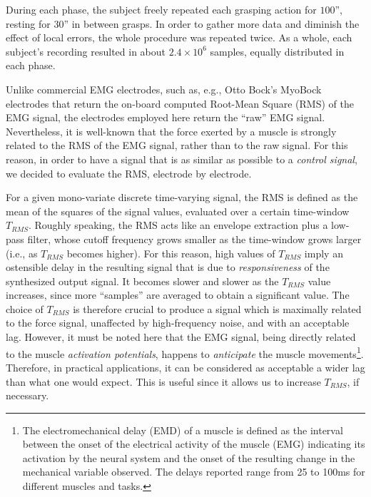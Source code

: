 During each phase, the subject freely repeated each grasping action
for $100$'', resting for $30$'' in between grasps. In order to gather
more data and diminish the effect of local errors, the whole procedure
was repeated twice. As a whole, each subject's recording resulted in
about $2.4\times 10^6$ samples, equally distributed in each phase.

Unlike commercial EMG electrodes, such as, e.g., Otto Bock's MyoBock
electrodes \cite{ottobock} that return the on-board computed Root-Mean
Square (RMS) of the EMG signal, the electrodes employed here return
the ``raw'' EMG signal.%
Nevertheless, it is well-known \cite{deluca,zecca} that the force
exerted by a muscle is strongly related to the RMS of the EMG signal,
rather than to the raw signal. For this reason, in order to have a
signal that is as similar as possible to a \emph{control signal}, we
decided to evaluate the RMS, electrode by electrode.

For a given mono-variate discrete time-varying signal, the RMS is
defined as the mean of the squares of the signal values, evaluated
over a certain time-window $T_{RMS}$. Roughly speaking, the RMS acts
like an envelope extraction plus a low-pass filter, whose cutoff
frequency grows smaller as the time-window grows larger (i.e., as
$T_{RMS}$ becomes higher). For this reason, high values of $T_{RMS}$
imply an ostensible delay in the resulting signal that is due to
\emph{responsiveness} of the synthesized output signal.  It becomes
slower and slower as the $T_{RMS}$ value increases, since more
``samples'' are averaged to obtain a significant value. The choice of
$T_{RMS}$ is therefore crucial to produce a signal which is maximally
related to the force signal, unaffected by high-frequency noise, and
with an acceptable lag. However, it must be noted here that the EMG
signal, being directly related to the muscle \emph{activation
potentials}, happens to \emph{anticipate} the muscle
movements\footnote{The electromechanical delay (EMD) of a muscle is
defined as the interval between the onset of the electrical activity
of the muscle (EMG) indicating its activation by the neural system and
the onset of the resulting change in the mechanical variable
observed. The delays reported range from 25 to 100ms for different
muscles and tasks\cite{Wolf1994}.}. Therefore, in practical
applications, it can be considered as acceptable a wider lag than what
one would expect.
This is useful since it allows us to increase $T_{RMS}$, if necessary.

